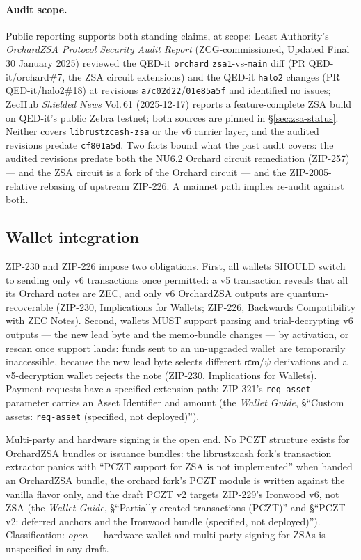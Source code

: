 \documentclass[11pt,a4paper]{article}
\theoremstyle{definition}
\newcommand{\rcm}{\ensuremath{\mathsf{rcm}}}
\begin{document}
\paragraph{Audit scope.} Public reporting supports both standing claims,
at scope: Least Authority's \emph{OrchardZSA Protocol Security Audit
Report} (ZCG-commissioned, Updated Final 30 January 2025) reviewed the
QED-it \texttt{orchard} \texttt{zsa1}-vs-\texttt{main} diff (PR
QED-it/orchard\#7, the ZSA circuit extensions) and the QED-it
\texttt{halo2} changes (PR QED-it/halo2\#18) at revisions
\texttt{a7c02d22}/\texttt{01e85a5f} and identified no issues; ZecHub
\emph{Shielded News} Vol.\,61 (2025-12-17) reports a feature-complete ZSA
build on QED-it's public Zebra testnet; both sources are pinned in
\S\ref{sec:zsa-status}. Neither covers \texttt{librustzcash-zsa} or the
v6 carrier layer, and the audited revisions predate \texttt{cf801a5d}.
Two facts bound what the past audit covers: the audited revisions predate
both the NU6.2 Orchard circuit remediation (ZIP-257) --- and the ZSA
circuit is a fork of the Orchard circuit --- and the ZIP-2005-relative
rebasing of upstream ZIP-226. A mainnet path implies re-audit against
both.

\subsection{Wallet integration}\label{sec:zsa-wallets}

ZIP-230 and ZIP-226 impose two obligations. First, all wallets SHOULD
switch to sending only v6 transactions once permitted: a v5 transaction
reveals that all its Orchard notes are ZEC, and only v6 OrchardZSA outputs
are quantum-recoverable (ZIP-230, Implications for Wallets; ZIP-226,
Backwards
Compatibility with ZEC Notes). Second, wallets MUST support parsing and
trial-decrypting v6 outputs --- the new lead byte and the memo-bundle
changes --- by activation, or rescan once support lands: funds sent to an
un-upgraded wallet are temporarily inaccessible, because the new lead byte
selects different $\rcm$/$\psi$ derivations and a v5-decryption wallet
rejects the note (ZIP-230, Implications for Wallets). Payment requests have
a
specified extension path: ZIP-321's \texttt{req-asset} parameter carries an
Asset Identifier and amount (the \emph{Wallet Guide}, \S``Custom assets:
\texttt{req-asset} (specified, not deployed)'').

Multi-party and hardware signing is the open end. No PCZT structure exists
for OrchardZSA bundles or issuance bundles: the librustzcash fork's
transaction extractor panics with ``PCZT support for ZSA is not
implemented'' when handed an OrchardZSA bundle, the orchard fork's PCZT
module is written against the vanilla flavor only, and the draft PCZT v2
targets ZIP-229's Ironwood v6, not ZSA (the \emph{Wallet Guide},
\S``Partially created transactions (PCZT)'' and \S``PCZT v2: deferred
anchors and the Ironwood bundle (specified, not deployed)'').
Classification: \emph{open} --- hardware-wallet and multi-party signing for
ZSAs is unspecified in any draft.
\end{document}
